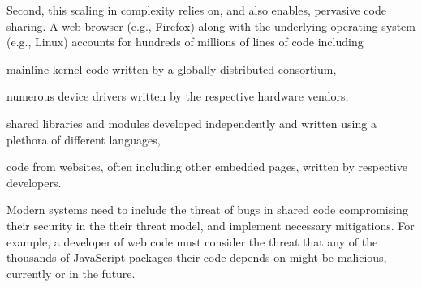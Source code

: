 Second, this scaling in complexity relies on, and also enables, pervasive code
sharing.
A web browser (e.g., Firefox) along with the underlying operating 
system (e.g., Linux) accounts for hundreds of millions of lines of code
including
\begin{inparaenum}
      \item mainline kernel code written by a globally distributed consortium,
      \item numerous device drivers written by the respective hardware 
            vendors,
      \item shared libraries and modules developed independently and 
            written using a plethora of different languages,
      \item code from websites, often including other embedded pages,
            written by respective developers.
\end{inparaenum}
Modern systems need to include the threat of bugs in shared code
compromising their security in the their threat model, and implement
necessary mitigations.
For example, a developer of web code must consider the threat that any of the
thousands of JavaScript packages their code depends on might be malicious,
currently or in the future.


